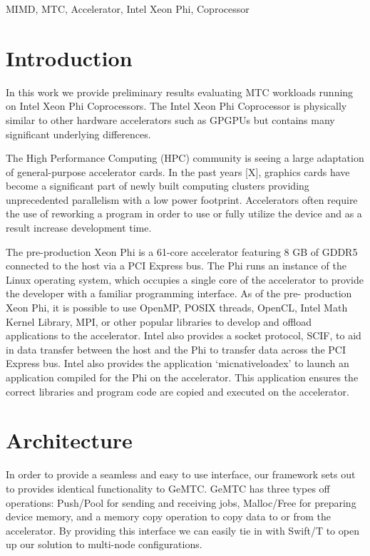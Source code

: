 \documentclass[conference]{IEEEtran}
\begin{document}
\begin{IEEEkeywords}
MIMD, MTC, Accelerator, Intel Xeon Phi, Coprocessor
\end{IEEEkeywords}

\IEEEpeerreviewmaketitle

\section{Introduction}
In this work we provide preliminary results evaluating MTC workloads running on Intel Xeon Phi Coprocessors. The Intel Xeon Phi Coprocessor is physically similar to other hardware accelerators such as GPGPUs but contains many significant underlying differences.

The High Performance Computing (HPC) community is seeing a large adaptation of general-purpose accelerator cards. In the past years [X], graphics cards have become a significant part of newly built computing clusters providing unprecedented parallelism with a low power footprint. Accelerators often require the use of reworking a program in order to use or fully utilize the device and as a result increase development time.

The pre-production Xeon Phi is a 61-core accelerator featuring 8 GB of GDDR5 connected to the host via a PCI Express bus. The Phi runs an instance of the Linux operating system, which occupies a single core of the accelerator to provide the developer with a familiar programming interface. As of the pre- production Xeon Phi, it is possible to use OpenMP, POSIX threads, OpenCL, Intel Math Kernel Library, MPI, or other popular libraries to develop and offload applications to the accelerator. Intel also provides a socket protocol, SCIF, to aid in data transfer between the host and the Phi to transfer data across the PCI Express bus. Intel also provides the application ‘micnativeloadex’ to launch an application compiled for the Phi on the accelerator. This application ensures the correct libraries and program code are copied and executed on the accelerator.

\section{Architecture}
In order to provide a seamless and easy to use interface, our framework sets out to provides identical functionality to GeMTC. \cite{kriederSC12} GeMTC has three types off operations: Push/Pool for sending and receiving jobs, Malloc/Free for preparing device memory, and a memory copy operation to copy data to or from the accelerator. By providing this interface we can easily tie in with Swift/T to open up our solution to multi-node configurations.
\end{document}
